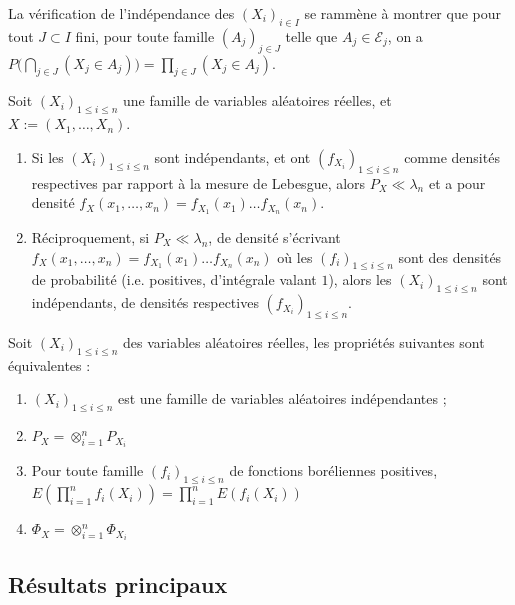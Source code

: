 \documentclass[11pt,a4paper]{article}
\begin{document}
\begin{rmq}
La vérification de l'indépendance des $(X_i)_{i\in I}$ se rammène à montrer que pour tout $J\subset I$ fini, pour toute famille $(A_j)_{j\in J}$ telle que $A_j\in \mathcal{E}_j$, on a $\displaystyle P\Big(\bigcap_{j\in J}(X_j\in A_j )\Big)=\prod_{j\in J}(X_j \in A_j)$.
\end{rmq}

\begin{propstar}
 Soit $(X_i)_{ 1 \leq i \leq n}$ une famille de variables aléatoires réelles, et $X:=(X_1,\dots,X_n)$. 
\begin{enumerate}
\item Si les $(X_i)_{ 1 \leq i \leq n}$ sont indépendants, et ont $(f_{X_i})_{1\leq i \leq n}$ comme densités respectives par rapport à la mesure de Lebesgue, alors $P_X \ll \lambda_n$ et a pour densité $f_X(x_1,\dots,x_n)=f_{X_1}(x_1)\dots f_{X_n}(x_n)$.
\item Réciproquement, si $P_X \ll \lambda_n$, de densité s'écrivant $f_X(x_1,\dots,x_n)=f_{X_1}(x_1)\dots f_{X_n}(x_n)$ où les $(f_i)_{1\leq i \leq n}$ sont des densités de probabilité (i.e. positives, d'intégrale valant $1$), alors les $(X_i)_{ 1 \leq i \leq n}$ sont indépendants, de densités respectives $(f_{X_i})_{1\leq i \leq n}$.
\end{enumerate}
\end{propstar}

\begin{corstar} Soit $(X_i)_{ 1 \leq i \leq n}$ des variables aléatoires réelles, les propriétés suivantes sont équivalentes :
\begin{enumerate}
\item  $(X_i)_{ 1 \leq i \leq n}$ est une famille de variables aléatoires indépendantes ; 
\item $P_X=\otimes_{i=1}^n P_{X_i}$
\item Pour toute famille $(f_i)_{1\leq i \leq n}$ de fonctions boréliennes positives, $\displaystyle E\left(\prod_{i=1}^n f_i(X_i)\right) = \prod_{i=1}^n E\left(f_i(X_i)\right)$
\item $\Phi_X=\otimes_{i=1}^n \Phi_{X_i}$
\end{enumerate}
\end{corstar}


\subsection*{Résultats principaux}
\end{document}
